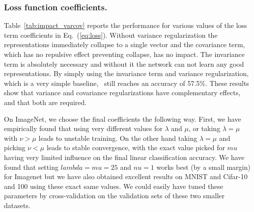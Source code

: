 \subsubsection{Loss function coefficients.} \label{app:loss_coeffs}
Table~\ref{tab:impact_varcov} reports the performance for various values of the loss term coefficients in Eq.~(\ref{eq:loss}). Without variance regularization the representations immediately collapse to a single vector and the covariance term, which has no repulsive effect preventing collapse, has no impact. The invariance term is absolutely necessary and without it the network can not learn any good representations. By simply using the invariance term and variance regularization, which is a very simple baseline, \algo \ still reaches an accuracy of 57.5$\%$. These results show that variance and covariance regularizations have complementary effects, and that both are required.

On ImageNet, we choose the final coefficients the following way. First, we have empirically found that using very different values for $\lambda$ and $\mu$, or taking $\lambda=\mu$ with $\nu > \mu$ leads to unstable training. On the other hand taking $\lambda=\mu$ and picking $\nu<\mu$ leads to stable convergence, with the exact value picked for $mu$ having very limited influence on the final linear classification accuracy. We have found that setting $lambda=mu= 25$ and $nu=1$ works best (by a small margin) for Imagenet but we have also obtained excellent results on MNIST and Cifar-10 and 100 using these exact same values. We could easily have tuned these parameters by cross-validation on the validation sets of these two smaller datasets.

